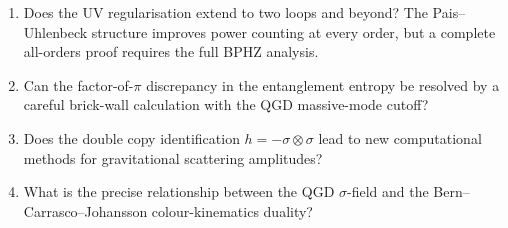 \documentclass[11pt,a4paper]{article}
\theoremstyle{plain}
\theoremstyle{definition}
\theoremstyle{remark}
\begin{document}
\begin{enumerate}
  \item Does the UV regularisation extend to two loops and beyond?  The Pais--Uhlenbeck structure improves power counting at every order, but a complete all-orders proof requires the full BPHZ analysis.
  \item Can the factor-of-$\pi$ discrepancy in the entanglement entropy be resolved by a careful brick-wall calculation with the QGD massive-mode cutoff?
  \item Does the double copy identification $h = -\sigma\otimes\sigma$ lead to new computational methods for gravitational scattering amplitudes?
  \item What is the precise relationship between the QGD $\sigma$-field and the Bern--Carrasco--Johansson colour-kinematics duality?
\end{enumerate}
\end{document}
